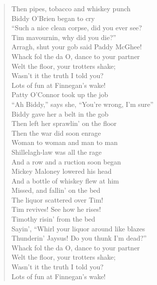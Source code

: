 \documentclass[11pt]{article}
\begin{document}
\begin{verse}
Then pipes, tobacco and whiskey punch\\
\vspace*{1em}
Biddy O'Brien began to cry\\
``Such a nice clean corpse, did you ever see?\\
Tim mavournin, why did you die?''\\
Arragh, shut your gob said Paddy McGhee!\\
\vspace*{1em}
Whack fol the da O, dance to your partner\\
Welt the floor, your trotters shake;\\
Wasn't it the truth I told you?\\
Lots of fun at Finnegan's wake!\\
Patty O'Connor took up the job\\
``Ah Biddy,'' says she, ``You're wrong, I'm sure''\\
Biddy gave her a belt in the gob\\
Then left her sprawlin' on the floor\\
\vspace*{1em}
Then the war did soon enrage\\
Woman to woman and man to man\\
Shillelagh-law was all the rage\\
And a row and a ruction soon began\\
\vspace*{1em}
Mickey Maloney lowered his head\\
And a bottle of whiskey flew at him\\
Missed, and fallin' on the bed\\
The liquor scattered over Tim!\\
\vspace*{1em}
Tim revives! See how he rises!\\
Timothy risin' from the bed\\
Sayin', ``Whirl your liquor around like blazes\\
Thunderin' Jaysus! Do you thunk I'm dead?''\\
\vspace*{1em}
Whack fol the da O, dance to your partner\\
Welt the floor, your trotters shake;\\
Wasn't it the truth I told you?\\
Lots of fun at Finnegan's wake!\\
\end{verse}
\clearpage
\end{document}
